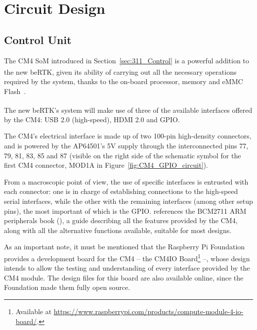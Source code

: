 
\section{Circuit Design}\label{sec:32_Circuit}



\subsection{Control Unit}\label{sec:322_CONTROL}
The CM4 \gls{SoM} introduced in Section~\ref{sec:311_Control} is a powerful addition to the new beRTK\textsuperscript{\textregistered}, given its ability of carrying out all the necessary operations required by the system, thanks to the on-board processor, memory and eMMC Flash~\cite{CM4}.

The new beRTK\textsuperscript{\textregistered}'s system will make use of three of the available interfaces offered by the CM4: USB 2.0 (high-speed), HDMI 2.0 and GPIO.

The CM4's electrical interface is made up of two 100-pin high-density connectors, and is powered by the AP64501's 5V supply through the interconnected pins 77, 79, 81, 83, 85 and 87 (visible on the right side of the schematic symbol for the first CM4 connector, MOD1A in Figure~\ref{fig:CM4_GPIO_circuit}).

From a macroscopic point of view, the use of specific interfaces is entrusted with each connector: one is in charge of establishing connections to the high-speed serial interfaces, while the other with the remaining interfaces (among other setup pins), the most important of which is the GPIO.
\cite{CM4} references the BCM2711 ARM peripherals book (\cite{BCM2711_book}), a guide describing all the features provided by the CM4, along with all the alternative functions available, suitable for most designs.

As an important note, it must be mentioned that the Raspberry Pi Foundation provides a development board for the CM4 -- the CM4IO Board\footnote[14]{Available at \url{https://www.raspberrypi.com/products/compute-module-4-io-board/}.} --, whose design intends to allow the testing and understanding of every interface provided by the CM4 module. The design files for this board are also available online, since the Foundation made them fully open source.

